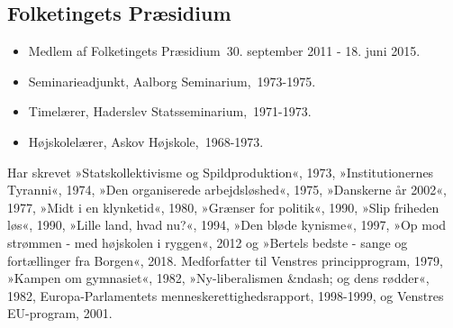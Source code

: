 \documentclass[11pt, a4paper]{awesome-cv}
\begin{document}
\begin{cvletter}
\subsection*{Folketingets Præsidium}
\begin{itemize}
\item Medlem af Folketingets Præsidium 30. september 2011 - 18. juni 2015.
\end{itemize}
\begin{itemize}
\item Seminarieadjunkt, Aalborg Seminarium, 1973-1975.
\item Timelærer, Haderslev Statsseminarium, 1971-1973.
\item Højskolelærer, Askov Højskole, 1968-1973.
\end{itemize}
Har skrevet »Statskollektivisme og Spildproduktion«, 1973, »Institutionernes Tyranni«, 1974, »Den organiserede arbejdsløshed«, 1975, »Danskerne år 2002«, 1977, »Midt i en klynketid«, 1980, »Grænser for politik«, 1990, »Slip friheden løs«, 1990, »Lille land, hvad nu?«, 1994, »Den bløde kynisme«, 1997, »Op mod strømmen - med højskolen i ryggen«, 2012 og »Bertels bedste - sange og fortællinger fra Borgen«, 2018. Medforfatter til Venstres principprogram, 1979, »Kampen om gymnasiet«, 1982, »Ny-liberalismen &ndash; og dens rødder«, 1982, Europa-Parlamentets menneskerettighedsrapport, 1998-1999, og Venstres EU-program, 2001.

\end{cvletter}
\end{document}
